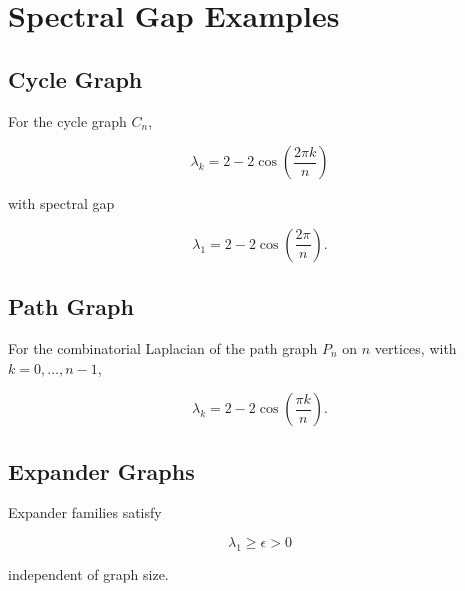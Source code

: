\chapter{Spectral Gap Examples}

\section{Cycle Graph}

For the cycle graph \(C_n\),

\[
\lambda_k = 2 - 2\cos\left(\frac{2\pi k}{n}\right)
\]

with spectral gap

\[
\lambda_1 = 2 - 2\cos\left(\frac{2\pi}{n}\right).
\]

\section{Path Graph}

For the combinatorial Laplacian of the path graph \(P_n\) on \(n\) vertices, with \(k=0,\ldots,n-1\),

\[
\lambda_k = 2 - 2\cos\left(\frac{\pi k}{n}\right).
\]

\section{Expander Graphs}

Expander families satisfy

\[
\lambda_1 \ge \epsilon > 0
\]

independent of graph size.
